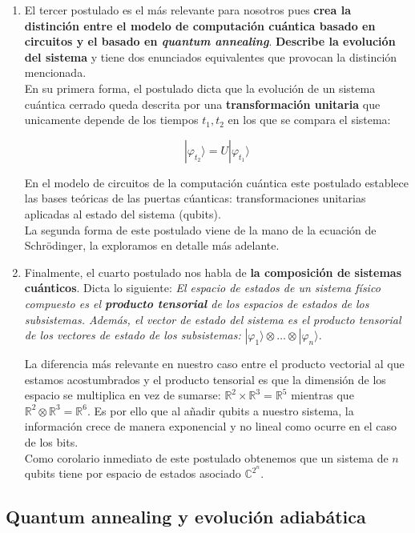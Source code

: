 \documentclass[11pt]{article}
\newcommand*{\C}{\mathbb{C}}
\newcommand*{\R}{\mathbb{R}}
\newcommand*{\ra}{\rangle}
\begin{document}
\begin{enumerate}
	\item El tercer postulado es el más relevante para nosotros pues \textbf{crea la distinción entre el modelo de computación cuántica basado en circuitos y el basado en \emph{quantum annealing}}. \textbf{Describe la evolución del sistema} y tiene dos enunciados equivalentes que provocan la distinción mencionada. \\
	
	En su primera forma, el postulado dicta que la evolución de un sistema cuántica cerrado queda descrita por una \textbf{transformación unitaria} que unicamente depende de los tiempos $t_1,t_2$ en los que se compara el sistema:
	
	\[ |\varphi_{t_2}\ra = U|\varphi_{t_1}\ra \]
	
	En el modelo de circuitos de la computación cuántica este postulado establece las bases teóricas de las puertas cúanticas: transformaciones unitarias aplicadas al estado del sistema (qubits). \\
	
	La segunda forma de este postulado viene de la mano de la ecuación de Schrödinger, la exploramos en detalle más adelante.
	
	\item Finalmente, el cuarto postulado nos habla de \textbf{la composición de sistemas cuánticos}. Dicta lo siguiente: \emph{El espacio de estados de un sistema físico compuesto es el \textbf{producto tensorial} de los espacios de estados de los subsistemas. Además, el vector de estado del sistema es el producto tensorial de los vectores de estado de los subsistemas:} $|\varphi_1\ra \otimes \dotsc \otimes |\varphi_n\ra$.
	
	La diferencia más relevante en nuestro caso entre el producto vectorial al que estamos acostumbrados y el producto tensorial es que la dimensión de los espacio se multiplica en vez de sumarse: $\R^2 \times \R^3 = \R^5$ mientras que $\R^2 \otimes \R^3 = \R^6$. Es por ello que al añadir qubits a nuestro sistema, la información crece de manera exponencial y no lineal como ocurre en el caso de los bits. \\
	
	Como corolario inmediato de este postulado obtenemos que un sistema de $n$ qubits tiene por espacio de estados asociado $\C^{2^n}$. 
\end{enumerate}

\subsection{Quantum annealing y evolución adiabática}
\end{document}
